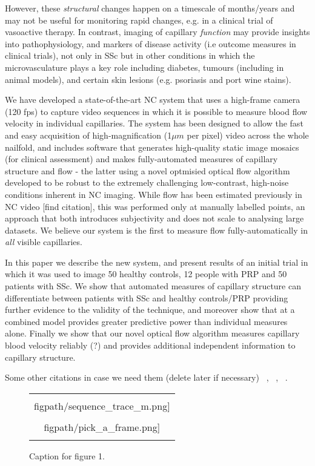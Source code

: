\documentclass[runningheads,a4paper]{llncs}
\def\figpath{./figs}
\def\figpath{./figs}
\begin{document}
However, these \textit{structural} changes happen on a timescale of months/years and may not be useful for monitoring rapid changes, e.g. in a clinical trial of vasoactive therapy. In contrast, imaging of capillary \textit{function} may provide insights into pathophysiology, and markers of disease activity (i.e outcome measures in clinical trials), not only in SSc but in other conditions in which the microvasculature plays a key role including diabetes, tumours (including in animal models), and certain skin lesions (e.g. psoriasis and port wine stains).

We have developed a state-of-the-art NC system that uses a high-frame camera (120 fps) to capture video sequences in which it is possible to measure blood flow velocity in individual capillaries. The system has been designed to allow the fast and easy acquisition of high-magnification (1${\mu}m$ per pixel) video across the whole nailfold, and includes software that generates high-quality static image mosaics (for clinical assessment) and makes fully-automated measures of capillary structure and flow - the latter using a novel optmisied optical flow algorithm developed to be robust to the extremely challenging low-contrast, high-noise conditions inherent in NC imaging. While flow has been estimated previously in NC video [find citation], this was performed only at manually labelled points, an approach that both introduces subjectivity and does not scale to analysing large datasets. We believe our system is the first to measure flow fully-automatically in \textit{all} visible capillaries.

In this paper we describe the new system, and present results of an initial trial in which it was used to image 50 healthy controls, 12 people with PRP and 50 patients with SSc. We show that automated measures of capillary structure can differentiate between patients with SSc and healthy controls/PRP providing further evidence to the validity of the technique, and moreover show that at a combined model provides greater predictive power than individual measures alone. Finally we show that our novel optical flow algorithm measures capillary blood velocity reliably (?) and provides additional independent information to capillary structure.


Some other citations in case we need them (delete later if necessary) ~\cite{Mayes_etal_AR03}, ~\cite{HerrickCOinR2011,HerrickAR2009}, ~\cite{Cutolo_etal_BPRCR08}.

\begin{figure}[t]
\centering
\begin{tabular}{@{}c@{}}
\texttt{[image: \\figpath/sequence\_trace\_m.png]}\\
\texttt{[image: \\figpath/pick\_a\_frame.png]}\\
\noalign{\smallskip}
\end{tabular}
%
\caption{Caption for figure 1.}
\label{f:capillaroscopy}
\end{figure}
%
\end{document}
